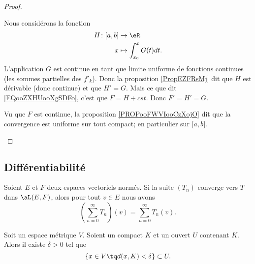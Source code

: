 \begin{proof}
\begin{subproof}
		Nous considérons la fonction
		\begin{equation}
			\begin{aligned}
				H\colon \mathopen[ a,b\mathclose] & \to \eR                     \\
				x                                 & \mapsto \int_{x_0}^xG(t)dt.
			\end{aligned}
		\end{equation}
		L'application \( G\) est continue en tant que limite uniforme de fonctions continues (les sommes partielles des \( f'_k\)). Donc la proposition \ref{PropEZFRsMj} dit que \( H\) est dérivable (donc continue) et que \( H'=G\). Mais ce que dit \eqref{EQooZXHUooXgSDFo}, c'est que \( F=H+cst\). Donc \( F'=H'=G\).

		Vu que \( F\) est continue, la proposition \ref{PROPooFWVIooCzXojO} dit que la convergence est uniforme sur tout compact; en particulier sur \( \mathopen[ a,b\mathclose]\).
	\end{subproof}
\end{proof}

\subsection{Différentiabilité}

\begin{lemma}       \label{LEMooPIWYooZEofkW}
	Soient \( E\) et \( F\) deux espaces vectoriels normés. Si la suite \( (T_n)\) converge vers \( T\) dans \( \aL(E,F)\), alors pour tout \( v\in E\) nous avons
	\begin{equation}
		\left( \sum_{n=0}^{\infty}T_n \right)(v)=\sum_{n=0}^{\infty}T_n(v).
	\end{equation}
\end{lemma}


\begin{lemma}       \label{LEMooEYARooNExmiw}
	Soit un espace métrique \( V\). Soient un compact \( K\) et un ouvert \( U\) contenant \( K\). Alors il existe \( \delta>0\) tel que
	\begin{equation}
		\{ x\in V\tq d(x,K)<\delta \}\subset U.
	\end{equation}
\end{lemma}

